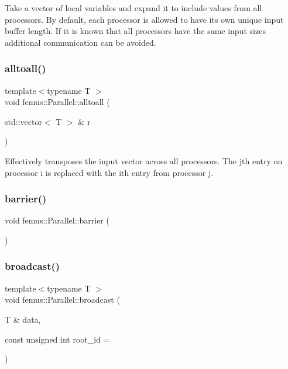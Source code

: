 Take a vector of local variables and expand it to include values from all processors. By default, each processor is allowed to have its own unique input buffer length. If it is known that all processors have the same input sizes additional communication can be avoided. \mbox{\label{namespacefemus_1_1_parallel_a879e4a9c2caf698f29d8da1403fece9f}} 
\subsubsection{\texorpdfstring{alltoall()}{alltoall()}}
{\footnotesize\ttfamily template$<$typename T $>$ \\
void femus\+::\+Parallel\+::alltoall (\begin{DoxyParamCaption}\item[{std\+::vector$<$ T $>$ \&}]{r }\end{DoxyParamCaption})\hspace{0.3cm}{\ttfamily [inline]}}

Effectively transposes the input vector across all processors. The jth entry on processor i is replaced with the ith entry from processor j. \mbox{\label{namespacefemus_1_1_parallel_a92f3377fb5ef4195c1db50a79b051c02}} 
\subsubsection{\texorpdfstring{barrier()}{barrier()}}
{\footnotesize\ttfamily void femus\+::\+Parallel\+::barrier (\begin{DoxyParamCaption}{ }\end{DoxyParamCaption})\hspace{0.3cm}{\ttfamily [inline]}}

\mbox{\label{namespacefemus_1_1_parallel_a82b297173b4771c824770ec9acac9689}} 
\subsubsection{\texorpdfstring{broadcast()}{broadcast()}\hspace{0.1cm}{\footnotesize\ttfamily [1/2]}}
{\footnotesize\ttfamily template$<$typename T $>$ \\
void femus\+::\+Parallel\+::broadcast (\begin{DoxyParamCaption}\item[{T \&}]{data,  }\item[{const unsigned int}]{root\+\_\+id = {} }\end{DoxyParamCaption})\hspace{0.3cm}{\ttfamily [inline]}}

